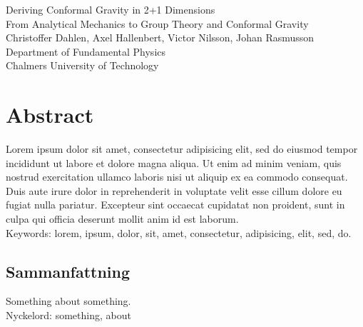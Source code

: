 Deriving Conformal Gravity in 2+1 Dimensions\\
From Analytical Mechanics to Group Theory and Conformal Gravity\\
Christoffer Dahlen, Axel Hallenbert, Victor Nilsson, Johan Rasmusson\\
Department of Fundamental Physics\\
Chalmers University of Technology\\

\thispagestyle{plain}			%
\section*{Abstract}
Lorem ipsum dolor sit amet, consectetur adipisicing elit, sed do eiusmod tempor incididunt ut labore et dolore magna aliqua. Ut enim ad minim veniam, quis nostrud exercitation ullamco laboris nisi ut aliquip ex ea commodo consequat. Duis aute irure dolor in reprehenderit in voluptate velit esse cillum dolore eu fugiat nulla pariatur. Excepteur sint occaecat cupidatat non proident, sunt in culpa qui officia deserunt mollit anim id est laborum.\\[0.5cm]

Keywords: lorem, ipsum, dolor, sit, amet, consectetur, adipisicing, elit, sed, do.

\begin{otherlanguage}{swedish}
\section*{Sammanfattning}

Something about something.\\[0.5cm]

Nyckelord: something, about
\end{otherlanguage}